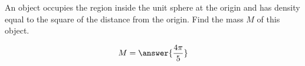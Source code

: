 \documentclass{ximera}
\author{David Guichard \and Neal Koblitz \and H. Jerome Keisler \and Albert Scheller \and Barry Balof \and Mike Wills \and Matthew Carr}
\begin{document}
\begin{exercise}




An object occupies the region inside the unit sphere at the origin and has density equal to the square of the distance from the origin. Find the mass $M$ of this object. 
\begin{prompt}
\[
M=\answer{\frac{4\pi}{5}}
\]
\end{prompt}



\end{exercise}
\end{document}
